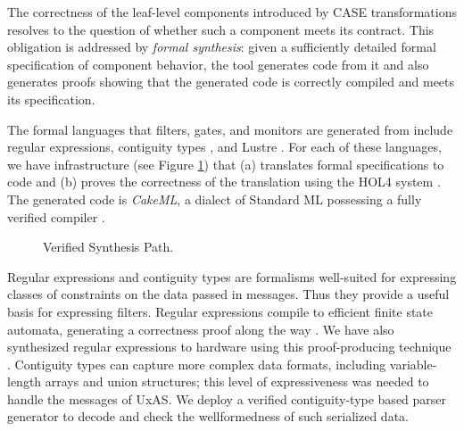 The correctness of the leaf-level components introduced by CASE
transformations resolves to the question of whether such a component
meets its \agree{} contract. This obligation is addressed by
\emph{formal synthesis}: given a sufficiently detailed formal
specification of component behavior, the \splat{} tool generates code
from it and also generates proofs showing that the generated code is
correctly compiled and meets its specification.

The formal languages that filters, gates, and monitors are generated
from include regular expressions, contiguity types
\cite{contiguity-types}, and Lustre \cite{lustre}. For each of these
languages, we have infrastructure (see Figure \ref{fig:synthesis})
that (a) translates formal specifications to code and (b) proves the
correctness of the translation using the HOL4 system
\cite{hol4:overview}. The generated code is \emph{CakeML}, a dialect
of Standard ML \cite{SML97} possessing a fully verified compiler
\cite{cakeml}.

\begin{figure}[h]
\begin{center}
\end{center}
\caption{\splat{} Verified Synthesis Path.\label{fig:synthesis}}
\end{figure}

Regular expressions and contiguity types are formalisms well-suited
for expressing classes of constraints on the data passed in
messages. Thus they provide a useful basis for expressing
filters. Regular expressions compile to efficient finite state
automata, generating a correctness proof along the way
\cite{case-verified-filter}.  We have also synthesized regular
expressions to hardware using this proof-producing
technique \cite{formal-filter-synth-langsec}.
Contiguity types can capture more complex
data formats, including variable-length arrays and union structures;
this level of expressiveness was needed to handle the messages of
UxAS. We deploy a verified contiguity-type based parser generator
\cite{contiguity-types} to decode and check the wellformedness of
such serialized data.

